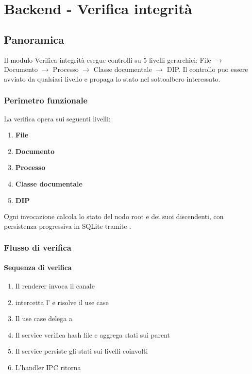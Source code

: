\newpage
\section{Backend - Verifica integrità}

\subsection{Panoramica}
\label{sec:integrity}

\noindent
Il modulo Verifica integrità esegue controlli su 5 livelli gerarchici:
File $\to$ Documento $\to$ Processo $\to$ Classe documentale $\to$ DIP.
Il controllo puo essere avviato da qualsiasi livello e propaga lo stato nel sottoalbero interessato.

\subsubsection{Perimetro funzionale}
\label{sec:integrity:perimetro}

\noindent
La verifica opera sui seguenti livelli:
\begin{enumerate}[labelwidth=0.8cm,leftmargin=1cm]
	\item \textbf{File}
	\item \textbf{Documento}
	\item \textbf{Processo}
	\item \textbf{Classe documentale}
	\item \textbf{DIP}
\end{enumerate}

\noindent
Ogni invocazione calcola lo stato del nodo root e dei suoi discendenti, con persistenza progressiva in SQLite tramite .

\subsubsection{Flusso di verifica}
\label{sec:integrity:flusso}

\paragraph{Sequenza di verifica}
\begin{enumerate}[labelwidth=0.8cm,leftmargin=1cm]
	\item Il renderer invoca il canale 
	\item {} intercetta l' e risolve il use case
	\item Il use case delega a 
	\item Il service verifica hash file e aggrega stati sui parent
	\item Il service persiste gli stati sui livelli coinvolti
	\item L'handler IPC ritorna 
\end{enumerate}


